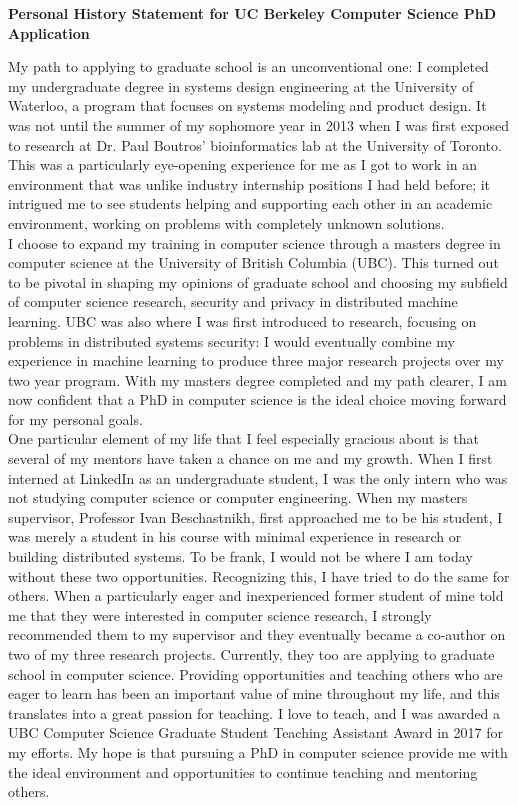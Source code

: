 \documentclass[10pt]{article} %
\begin{document}
\begin{center}
{\large \bf Personal History Statement for UC Berkeley Computer Science PhD Application}
\end{center}

My path to applying to graduate school is an unconventional one: I completed my undergraduate degree in systems design engineering at the University of Waterloo, a program that focuses on systems modeling and product design. It was not until the summer of my sophomore year in 2013 when I was first exposed to research at Dr. Paul Boutros' bioinformatics lab at the University of Toronto. This was a particularly eye-opening experience for me as I got to work in an environment that was unlike industry internship positions I had held before; it intrigued me to see students helping and supporting each other in an academic environment, working on problems with completely unknown solutions. \\

I choose to expand my training in computer science through a masters degree in computer science at the University of British Columbia (UBC). This turned out to be pivotal in shaping my opinions of graduate school and choosing my subfield of computer science research, security and privacy in distributed machine learning. UBC was also where I was first introduced to research, focusing on problems in distributed systems security: I would eventually combine my experience in machine learning to produce three major research projects over my two year program. With my masters degree completed and my path clearer, I am now confident that a PhD in computer science is the ideal choice moving forward for my personal goals. \\

One particular element of my life that I feel especially gracious about is that several of my mentors have taken a chance on me and my growth. When I first interned at LinkedIn as an undergraduate student, I was the only intern who was not studying computer science or computer engineering. When my masters supervisor, Professor Ivan Beschastnikh, first approached me to be his student, I was merely a student in his course with minimal experience in research or building distributed systems. To be frank, I would not be where I am today without these two opportunities. Recognizing this, I have tried to do the same for others. When a particularly eager and inexperienced former student of mine told me that they were interested in computer science research, I strongly recommended them to my supervisor and they eventually became a co-author on two of my three research projects. Currently, they too are applying to graduate school in computer science. Providing opportunities and teaching others who are eager to learn has been an important value of mine throughout my life, and this translates into a great passion for teaching. I love to teach, and I was awarded a UBC Computer Science Graduate Student Teaching Assistant Award in 2017 for my efforts. My hope is that pursuing a PhD in computer science provide me with the ideal environment and opportunities to continue teaching and mentoring others.\\        
\end{document}
